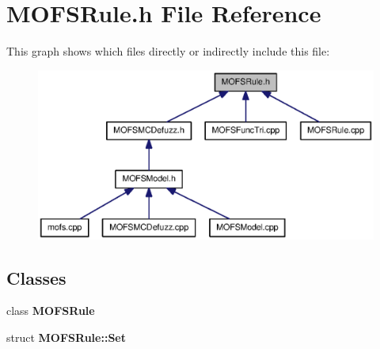 \section{M\-O\-F\-S\-Rule.\-h File Reference}
\label{MOFSRule_8h}
This graph shows which files directly or indirectly include this file\-:\nopagebreak
\begin{figure}[H]
\begin{center}
\leavevmode
\includegraphics[width=350pt]{MOFSRule_8h__dep__incl}
\end{center}
\end{figure}
\subsection*{Classes}
\begin{DoxyCompactItemize}
\item 
class {\bf M\-O\-F\-S\-Rule}
\item 
struct {\bf M\-O\-F\-S\-Rule\-::\-Set}
\end{DoxyCompactItemize}
